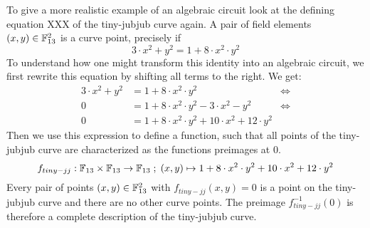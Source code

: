 \begin{example} To give a more realistic example of an algebraic circuit look at the defining equation XXX of the tiny-jubjub curve again. A pair of field elements 
$(x,y)\in \mathbb{F}_{13}^2$ is a curve point, precisely if
$$
3\cdot x^2 + y^2 = 1+ 8\cdot x^2\cdot y^2
$$ 
To understand how one might transform this identity into an algebraic circuit, we first rewrite this equation by shifting all terms to the right. We get:
\begin{align*}
3\cdot x^2 + y^2 & = 1+ 8\cdot x^2\cdot y^2 & \Leftrightarrow\\
0 & = 1+ 8\cdot x^2\cdot y^2 - 3\cdot x^2 - y^2 & \Leftrightarrow\\
0 & = 1+ 8\cdot x^2\cdot y^2 + 10\cdot x^2 +12\cdot y^2
\end{align*}
Then we use this expression to define a function, such that all points of the tiny-jubjub curve are characterized as the functions preimages at $0$.
$$
f_{tiny-jj}: \mathbb{F}_{13}\times \mathbb{F}_{13}\to \mathbb{F}_{13}\; ; \;
(x,y)\mapsto 1+ 8\cdot x^2\cdot y^2 + 10\cdot x^2 +12\cdot y^2
$$
Every pair of points $(x,y)\in \mathbb{F}_{13}^2$ with $f_{tiny-jj}(x,y)=0$ is a point on the tiny-jubjub curve and there are no other curve points. The preimage $f_{tiny-jj}^{-1}(0)$ is therefore a complete description of the tiny-jubjub curve.


\end{example}
